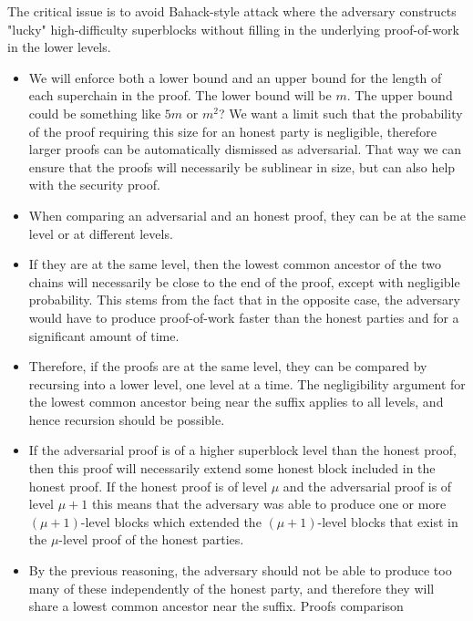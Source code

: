 The critical issue is to avoid Bahack-style attack \cite{bahack} where the
adversary constructs "lucky" high-difficulty superblocks without filling in
the underlying proof-of-work in the lower levels.

\begin{itemize}
    \item
        We will enforce both a lower bound and an upper bound for the length of
        each superchain in the proof. The lower bound will be $m$. The upper
        bound could be something like $5m$ or $m^2$? We want a limit such that
        the probability of the proof requiring this size for an honest party is
        negligible, therefore larger proofs can be automatically dismissed as
        adversarial. That way we can ensure that the proofs will necessarily be
        sublinear in size, but can also help with the security proof.
    \item
        When comparing an adversarial and an honest proof, they can be at the
        same level or at different levels.
    \item
        If they are at the same level, then the lowest common ancestor of the
        two chains will necessarily be close to the end of the proof, except
        with negligible probability. This stems from the fact that in the
        opposite case, the adversary would have to produce proof-of-work faster
        than the honest parties and for a significant amount of time.
    \item
        Therefore, if the proofs are at the same level, they can be compared by
        recursing into a lower level, one level at a time. The negligibility
        argument for the lowest common ancestor being near the suffix applies
        to all levels, and hence recursion should be possible.
    \item
        If the adversarial proof is of a higher superblock level than the
        honest proof, then this proof will necessarily extend some honest block
        included in the honest proof. If the honest proof is of level $\mu$ and
        the adversarial proof is of level $\mu + 1$ this means that the
        adversary was able to produce one or more $(\mu + 1)$-level blocks
        which extended the $(\mu + 1)$-level blocks that exist in the
        $\mu$-level proof of the honest parties.
    \item
        By the previous reasoning, the adversary should not be able to produce
        too many of these independently of the honest party, and therefore they
        will share a lowest common ancestor near the suffix. Proofs comparison

\end{itemize}
